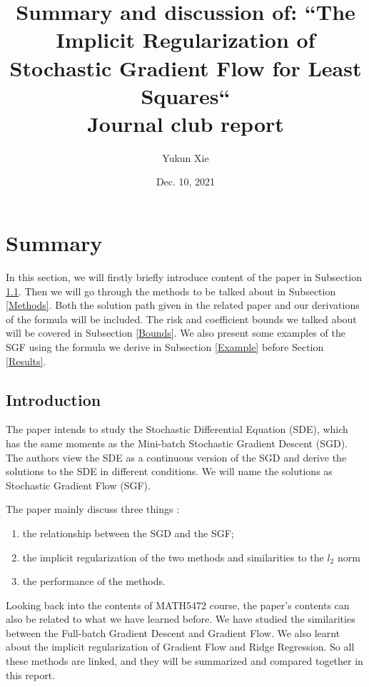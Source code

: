 \documentclass[11pt]{article}
\title{Summary and discussion of: ``The Implicit Regularization of Stochastic Gradient Flow for Least Squares`` \\
\large Journal club report}
\author{Yukun Xie}
\date{Dec. 10, 2021}
\begin{document}
\maketitle

\section{Summary} \label{Summary}

In this section, we will firstly briefly introduce content of the paper in Subsection \ref{Intro}. Then we will go through the methods to be talked about in Subsection \ref{Methods}. Both the solution path given in the related paper and our derivations of the formula will be included. The risk and coefficient bounds we talked about will be covered in Subsection \ref{Bounds}. We also present some examples of the SGF using the formula we derive in Subsection \ref{Example} before Section \ref{Results}.

\subsection{Introduction} \label{Intro}

The paper intends to study the Stochastic Differential Equation (SDE), which has the same moments as the Mini-batch Stochastic Gradient Descent (SGD). The authors view the SDE as a continuous version of the SGD and derive the solutions to the SDE in different conditions. We will name the solutions as Stochastic Gradient Flow (SGF).

The paper mainly discuss three things : 

\begin{enumerate}
    \item the relationship between the  SGD and the SGF; 
    
    \item the implicit regularization of the two methods and similarities to the $l_2$ norm
    
    \item the performance of the methods.
\end{enumerate}

Looking back into the contents of MATH5472 course, the paper's contents can also be related to what we have learned before. We have studied the similarities between the Full-batch Gradient Descent and Gradient Flow. We also learnt about the implicit regularization of Gradient Flow and Ridge Regression. So all these methods are linked, and they will be summarized and compared together in this report.
\end{document}

